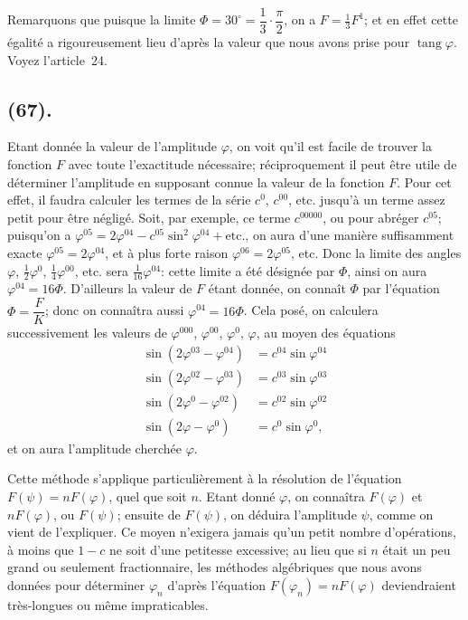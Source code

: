 \documentclass{article}
\begin{document}
Remarquons que puisque la limite $\Phi=30^{\circ}=\dfrac{1}{3}\cdot\dfrac{\pi}{2}$, on a $F=\frac{1}{3}F^{1}$; et en effet cette égalité a rigoureusement lieu d'après la valeur que nous avons prise pour $\operatorname{tang}\varphi$. Voyez l'article~24.

\subsection*{(67).}

Etant donnée la valeur de l'amplitude $\varphi$, on voit qu'il est facile de trouver la fonction $F$ avec toute l'exactitude nécessaire; réciproquement il peut être utile de déterminer l'amplitude en supposant connue la valeur de la fonction $F$. Pour cet effet, il faudra calculer les termes de la série $c^{0}$, $c^{00}$, etc. jusqu'à un terme assez petit pour être négligé. Soit, par exemple, ce terme $c^{00000}$, ou pour abréger $c^{05}$; puisqu'on a $\varphi^{05}=2\varphi^{04}-c^{05}\sin^{2}\varphi^{04}+\text{etc.}$, on aura d'une manière suffisamment exacte $\varphi^{05}=2\varphi^{04}$, et à plus forte raison $\varphi^{06}=2\varphi^{05}$, etc. Donc la limite des angles $\varphi$, $\frac{1}{2}\varphi^{0}$, $\frac{1}{4}\varphi^{00}$, etc. sera $\frac{1}{16}\varphi^{04}$: cette limite a été désignée par $\Phi$, ainsi on aura $\varphi^{04}=16\Phi$. D'ailleurs la valeur de $F$ étant donnée, on connaît $\Phi$ par l'équation $\Phi=\dfrac{F}{K}$; donc on connaîtra aussi $\varphi^{04}=16\Phi$. Cela posé, on calculera successivement les valeurs de $\varphi^{000}$, $\varphi^{00}$, $\varphi^{0}$, $\varphi$, au moyen des équations
\[ \begin{aligned} \sin(2\varphi^{03}-\varphi^{04})&=c^{04}\sin\varphi^{04}\\ \sin(2\varphi^{02}-\varphi^{03})&=c^{03}\sin\varphi^{03}\\ \sin(2\varphi^{0}-\varphi^{02})&=c^{02}\sin\varphi^{02}\\ \sin(2\varphi-\varphi^{0})&=c^{0}\sin\varphi^{0}, \end{aligned} \]
et on aura l'amplitude cherchée $\varphi$.

Cette méthode s'applique particulièrement à la résolution de l'équation $F(\psi)=nF(\varphi)$, quel que soit $n$. Etant donné $\varphi$, on connaîtra $F(\varphi)$ et $nF(\varphi)$, ou $F(\psi)$; ensuite de $F(\psi)$, on déduira l'amplitude $\psi$, comme on vient de l'expliquer. Ce moyen n'exigera jamais qu'un petit nombre d'opérations, à moins que $1-c$ ne soit d'une petitesse excessive; au lieu que si $n$ était un peu grand ou seulement fractionnaire, les méthodes algébriques que nous avons données pour déterminer $\varphi_{n}$ d'après l'équation $F(\varphi_{n})=nF(\varphi)$ deviendraient très-longues ou même impraticables.
\end{document}
